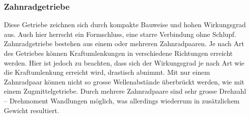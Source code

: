 \subsubsection{Zahnradgetriebe}
Diese Getriebe zeichnen sich durch kompakte Bauweise und hohen Wirkungsgrad aus. Auch hier herrscht ein Formschluss,  eine starre Verbindung ohne Schlupf. Zahnradgetriebe bestehen aus einem oder mehreren Zahnradpaaren. Je nach Art des Getriebes können Kraftumlenkungen in verschiedene Richtungen erreicht werden. Hier ist jedoch zu beachten, dass sich der Wirkungsgrad je nach Art wie die Kraftumlenkung erreicht wird, drastisch abnimmt. Mit nur einem Zahnradpaar können nicht so grosse Wellenabstände überbrückt werden, wie mit einem Zugmittelgetriebe. Durch mehrere Zahnradpaare sind sehr grosse Drehzahl – Drehmoment Wandlungen möglich, was allerdings wiederrum in zusätzlichem Gewicht resultiert. 